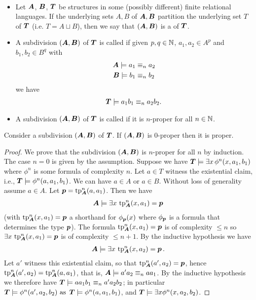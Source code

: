 \begin{Definition} \ 
  \begin{itemize}
  \item Let $\AT$, $\BT$, $\TTB$ be structures in some (possibly different) finite relational languages. If the underlying sets $A, B$ of $\AT, \BT$ partition the underlying set $T$ of $\TTB$ (i.e. $T = A \sqcup B$), then we say that $(\AT, \BT)$ is a  of $\TTB$.
  \item A subdivision $(\AT, \BT)$ of $\TTB$ is called \defn{$n$-proper} if given $p,q \in \N$,  $a_1, a_2 \in A^p$ and $b_1, b_2 \in B^q$ with
    \begin{align*}
      \AT \models a_1 &\equiv_n a_2 \\
      \BT \models b_1 &\equiv_n b_2
    \end{align*}
    we have
    \begin{align*}
      \TTB \models a_1b_1 \equiv_n a_2b_2.
    \end{align*}
  \item A subdivision $(\AT, \BT)$ of $\TTB$ is called  if it is $n$-proper for all $n \in \N$.
  \end{itemize}
\end{Definition}

\begin{Lemma} \label{lm_subdivision}
  Consider a subdivision $(\AT, \BT)$ of $\TTB$. If $(\AT, \BT)$ is $0$-proper then it is proper.
\end{Lemma}

\begin{proof}
  We prove that the subdivision $(\AT, \BT)$ is $n$-proper for all $n$ by induction.
  The case $n = 0$ is given by the assumption.
  Suppose we have $\TTB \models \exists x \, \phi^n(x, a_1, b_1)$ where $\phi^n$ is some formula of complexity $n$. Let $a \in T$ witness the existential claim, i.e., $\TTB \models \phi^n(a, a_1, b_1)$. We can have $a \in A$ or $a \in B$. Without loss of generality assume $a \in A$. Let $\pp = \tp^n_{\AT} (a, a_1)$. Then we have 
  \begin{align*}
    \AT \models \exists x \, \tp^n_{\AT}(x, a_1) = \pp
  \end{align*}
  (with $\tp^n_{\AT}(x, a_1) = \pp$ a shorthand for $\phi_{\pp}(x)$ where $\phi_{\pp}$ is a formula that determines the type $\pp$).
  The formula $\tp^n_{\AT}(x, a_1) = \pp$ is of complexity $\leq n$ so $\exists x \, \tp^n_{\AT}(x, a_1) = \pp$ is of complexity $\leq n+1$. By the inductive hypothesis we have
  \begin{align*}
    \AT \models \exists x \, \tp^n_{\AT}(x, a_2) = \pp.
  \end{align*}
  Let $a'$ witness this existential claim, so that $\tp^n_{\AT}(a', a_2) = \pp$, hence $\tp^n_{\AT}(a', a_2) = \tp^n_{\AT}(a, a_1)$, that is,
  $\AT \models a'a_2 \equiv_n aa_1$. By the inductive hypothesis we therefore have
  $\TTB \models aa_1b_1 \equiv_n a'a_2b_2$; in particular $\TTB \models \phi^n(a', a_2, b_2)  \text { as } \TTB \models \phi^n(a, a_1, b_1)$,
  and $\TTB \models \exists x \phi^n(x, a_2, b_2)$.
\end{proof}

